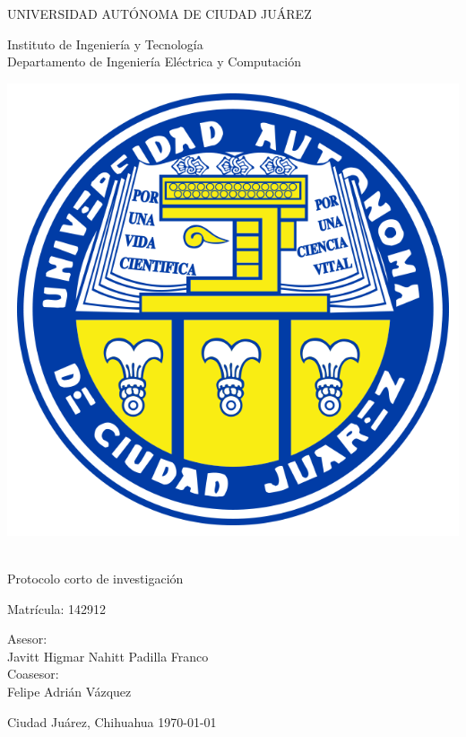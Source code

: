 \thispagestyle{empty}

\begin{center} \vfill

{\Large UNIVERSIDAD AUTÓNOMA DE CIUDAD JUÁREZ}\\
\vspace{6mm}
{\large Instituto de Ingeniería y Tecnología\\
\vspace{6mm}
Departamento de Ingeniería Eléctrica y Computación
\vspace{20mm}

\includegraphics [scale=0.7]{images/escudo-uacj.png}
\vspace{10mm}

\thetitle\\

\vspace{15mm}
Protocolo corto de investigación\\
\vspace{5mm}

\theauthor\hspace{10mm} Matrícula: 142912\\
\vspace{15mm}

Asesor:\\
Javitt Higmar Nahitt Padilla Franco
\\
\vspace{5mm}
Coasesor:\\
Felipe Adrián Vázquez

} \vfill
	Ciudad Juárez, Chihuahua \hspace{30mm}\today


\end{center}
